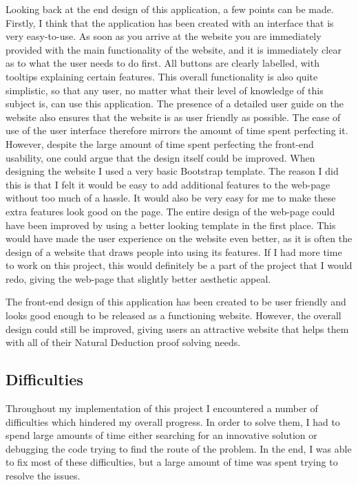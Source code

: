 Looking back at the end design of this application, a few points can be made. Firstly, I think that the application has been created with an interface that is very easy-to-use. As soon as you arrive at the website you are immediately provided with the main functionality of the website, and it is immediately clear as to what the user needs to do first. All buttons are clearly labelled, with tooltips explaining certain features. This overall functionality is also quite simplistic, so that any user, no matter what their level of knowledge of this subject is, can use this application. The presence of a detailed user guide on the website also ensures that the website is as user friendly as possible. The ease of use of the user interface therefore mirrors the amount of time spent perfecting it. However, despite the large amount of time spent perfecting the front-end usability, one could argue that the design itself could be improved. When designing the website I used a very basic Bootstrap template. The reason I did this is that I felt it would be easy to add additional features to the web-page without too much of a hassle. It would also be very easy for me to make these extra features look good on the page. The entire design of the web-page could have been improved by using a better looking template in the first place. This would have made the user experience on the website even better, as it is often the design of a website that draws people into using its features. If I had more time to work on this project, this would definitely be a part of the project that I would redo, giving the web-page that slightly better aesthetic appeal.

The front-end design of this application has been created to be user friendly and looks good enough to be released as a functioning website. However, the overall design could still be improved, giving users an attractive website that helps them with all of their Natural Deduction proof solving needs.

\subsection{Difficulties \label{difficulties}}

Throughout my implementation of this project I encountered a number of difficulties which hindered my overall progress. In order to solve them, I had to spend large amounts of time either searching for an innovative solution or debugging the code trying to find the route of the problem. In the end, I was able to fix most of these difficulties, but a large amount of time was spent trying to resolve the issues.

